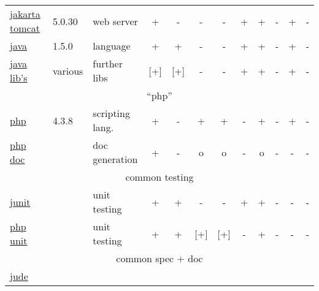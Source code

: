 \begin{table}[htbp]
\begin{tabular}[t]{|lll|cc|ccccccc|}
    \href{http://jakarta.apache.org/tomcat/index.html}{jakarta tomcat}
    &
    5.0.30 %
    & 
    web server %
    & 
    +  %
    & 
    -  %
    &
    - %
    &
    - %
    &
    + %
    &
    + %
    & 
    - %
    &
    + %
    &
    - %
    \\
    \href{http://java.sun.com/j2se/index.jsp}{java}
    &
    1.5.0 %
    & 
    language %
    & 
    +  %
    & 
    +  %
    &
    - %
    &
    - %
    &
    + %
    &
    + %
    & 
    - %
    &
    + %
    &
    - %
    \\
    \href{http://www.informatik.uni-kiel.de/~java}{java lib's}
    &
    various %
    & 
    further libs %
    & 
    [+] %
    & 
    [+]  %
    &
    - %
    &
    - %
    &
    + %
    &
    + %
    & 
    - %
    &
    + %
    &
    - %
    \\\hline
    \multicolumn{12}{|c|}{``php''}
    \\\hline
    \href{https://www.php.net}{php}
    &
    4.3.8 %
    & 
    scripting lang. %
    & 
    +  %
    & 
    -  %
    &
    + %
    &
    + %
    &
    - %
    &
    + %
    & 
    - %
    &
    + %
    &
    - %
    \\
    \href{http://www.phpdoc.org}{php doc}
    &
    & 
    doc generation
    & 
    +  %
    & 
    -  %
    &
    o %
    &
    o %
    &
    - %
    &
    o %
    & 
    - %
    &
    - %
    &
    - %
    \\\hline
    \multicolumn{12}{|c|}{common testing}
    \\\hline
    \href{http://www.junit.org}{junit}
    &
    &
    unit testing
    & 
    +  %
    & 
    +  %
    &
    - %
    &
    - %
    &
    + %
    &
    + %
    & 
    - %
    &
    - %
    &
    - %
    \\
    \href{http://www.sebastian-bergmann.de/en/phpunit.php}{php unit} 
    &
    &
    unit testing
    & 
    +  %
    & 
    +  %
    &
    [+] %
    &
    [+] %
    &
    - %
    &
    + %
    & 
    - %
    &
    - %
    &
    - %
    \\\hline
    \multicolumn{12}{|c|}{common spec + doc}
    \\\hline
    \href{https://www.esm.jp/jude-web/en/index.html}{jude}

\end{tabular}
\end{table}
